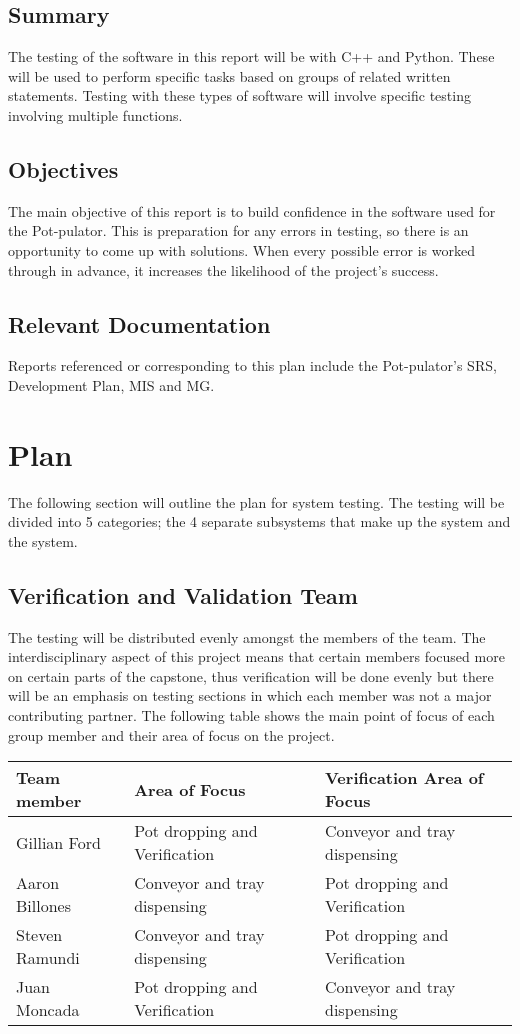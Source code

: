 \documentclass[12pt, titlepage]{article}
\begin{document}
\subsection{Summary}
The testing of the software in this report will be with C++ and Python. These will be used to perform specific tasks based on groups of related written statements. Testing with these types of software will involve specific testing involving multiple functions. 

\subsection{Objectives}
The main objective of this report is to build confidence in the software used for the Pot-pulator. This is preparation for any errors in testing, so there is an opportunity to come up with solutions. When every possible error is worked through in advance, it increases the likelihood of the project’s success. 

\subsection{Relevant Documentation}
Reports referenced or corresponding to this plan include the Pot-pulator’s SRS, Development Plan, MIS and MG. 
\section{Plan}
The following section will outline the plan for system testing. The testing 
will be divided into 5 categories; the 4 separate subsystems that make up the system and the system.

\subsection{Verification and Validation Team}

The testing will be distributed evenly amongst the members of the team. The interdisciplinary aspect of this 
project means that certain members focused more on certain parts of the capstone, thus verification will be 
done evenly but there will be an emphasis on testing sections in which each member was not a major contributing partner.
The following table shows the main point of focus of each group member and their area of focus on the project.
\begin{center}
  \begin{tabular}{ |l|l|l| } 
    \hline
    \textbf{Team member} & \textbf{Area of Focus } & \textbf{Verification Area of Focus} \\ 
    \hline
    Gillian Ford   & Pot dropping and Verification & Conveyor and tray dispensing \\
    Aaron Billones & Conveyor and tray dispensing & Pot dropping and Verification \\
    Steven Ramundi & Conveyor and tray dispensing & Pot dropping and Verification \\
    Juan Moncada   & Pot dropping and Verification & Conveyor and tray dispensing\\
    \hline
  \end{tabular}
\end{center}
\end{document}
